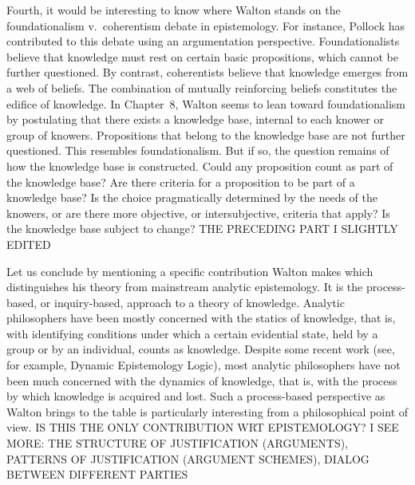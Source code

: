 \documentclass[12pt]{article}
\begin{document}
Fourth, it would be interesting to know where Walton stands on the foundationalism v.\ coherentism 
debate in epistemology. For instance, Pollock has contributed to this debate using an argumentation perspective. Foundationalists believe that knowledge must rest on certain basic propositions, which cannot be further questioned. By contrast, coherentists believe that knowledge emerges from a web of beliefs. The combination of mutually reinforcing beliefs constitutes 
the edifice of knowledge. In Chapter~8, %
Walton seems to lean toward foundationalism by postulating that there exists a knowledge base, internal to each knower or group of knowers. 
Propositions that belong to the knowledge base are not further questioned.
This resembles foundationalism. But if so, the question remains of how 
the knowledge base is constructed. Could any proposition count as 
part of the knowledge base? Are there criteria for a proposition 
to be part of a knowledge base? Is the choice pragmatically determined 
by the needs of the knowers, or are there more objective, 
or intersubjective, criteria that apply? Is the knowledge base subject to change?
THE PRECEDING PART I SLIGHTLY EDITED


Let us conclude by mentioning 
a specific contribution Walton makes which distinguishes his theory   
from mainstream analytic epistemology. It is the process-based, or
inquiry-based, approach to a theory of knowledge. Analytic
philosophers have been mostly concerned with the statics of knowledge, 
that is, with identifying conditions under which a certain
evidential state, held by a group or by an individual, counts as
knowledge. Despite some recent work (see, for example, 
Dynamic Epistemology Logic), most analytic philosophers have not
been much concerned with the dynamics of knowledge, that is, with
the process by which knowledge is acquired and lost. Such a process-based
perspective as Walton brings to the table is particularly interesting
from a philosophical point of view.
IS THIS THE ONLY CONTRIBUTION WRT EPISTEMOLOGY? I SEE MORE: THE STRUCTURE OF JUSTIFICATION (ARGUMENTS), PATTERNS OF JUSTIFICATION (ARGUMENT SCHEMES), DIALOG BETWEEN DIFFERENT PARTIES
\end{document}
